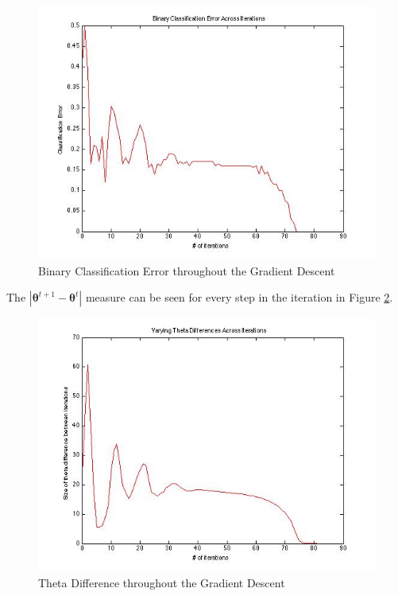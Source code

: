 \documentclass[paper=a4, fontsize=11pt]{scrartcl} %
\begin{document}
\begin{figure}
\centering
\includegraphics[scale=0.4]{BinClassErr.jpg}
\caption{Binary Classification Error throughout the Gradient Descent}
\label{fig:BinErr}
\end{figure}

The $| \bm{\theta} ^{t+1} -  \bm{\theta} ^t|$ measure can be seen for every step in the iteration in Figure \ref{fig:thetadiff}.

\begin{figure}
\centering
\includegraphics[scale=0.4]{theta_diff.jpg}
\caption{Theta Difference throughout the Gradient Descent}
\label{fig:thetadiff}
\end{figure}
\end{document}
